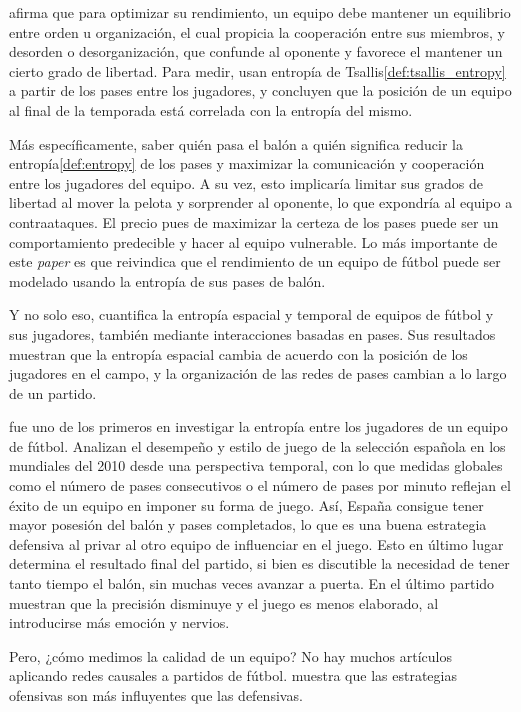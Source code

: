 \cite{entropy-analysis} afirma que para optimizar su rendimiento, un 
equipo debe mantener un equilibrio entre orden u organización, el cual 
propicia la cooperación entre sus miembros, y desorden o desorganización, que confunde 
al oponente y favorece el mantener un cierto grado de libertad. Para medir, usan entropía de 
Tsallis\ref{def:tsallis_entropy} a partir de los pases entre los jugadores, y concluyen que la posición de un equipo 
al final de la temporada está correlada con la entropía del mismo. 

Más específicamente, saber quién pasa el balón a quién significa reducir la entropía\ref{def:entropy} de los pases y maximizar 
la comunicación y cooperación entre los jugadores del equipo. A su vez, esto implicaría limitar sus 
grados de libertad al mover la pelota y sorprender al oponente, lo que expondría al equipo a contraataques. El precio 
pues de maximizar la certeza de los pases puede ser un comportamiento predecible y hacer al equipo vulnerable. Lo más importante 
de este \textit{paper} es que reivindica que el rendimiento de un equipo de fútbol puede 
ser modelado usando la entropía de sus pases de balón.

Y no solo eso, \cite{spatial-and-temporal-entropies} cuantifica la entropía espacial y temporal de 
equipos de fútbol y sus jugadores, también mediante interacciones basadas en pases. Sus resultados 
muestran que la entropía espacial cambia de acuerdo con la posición de los jugadores en el campo, y la 
organización de las redes de pases cambian a lo largo de un partido. 

\cite{network-analysis} fue uno de los primeros en investigar la entropía entre los jugadores de un equipo de 
fútbol. Analizan el desempeño y estilo de juego de la selección española en los mundiales del 2010 desde una 
perspectiva temporal, con lo que medidas globales como el número de pases consecutivos o el número de 
pases por minuto reflejan el éxito de un equipo en imponer su forma de juego.
Así, España consigue tener mayor posesión del balón y pases completados, lo que es una buena estrategia defensiva 
al privar al otro equipo de influenciar en el juego. Esto en último lugar determina el resultado final del partido, 
si bien es discutible la necesidad de tener tanto tiempo el balón, sin muchas veces avanzar a puerta. En el 
último partido muestran que la precisión disminuye y el juego es menos elaborado, al introducirse 
más emoción y nervios.

Pero, ¿cómo medimos la calidad de un equipo? No hay muchos artículos aplicando redes causales a partidos de 
fútbol. \cite{cerqueira} muestra que las estrategias ofensivas son más influyentes que las defensivas.




 